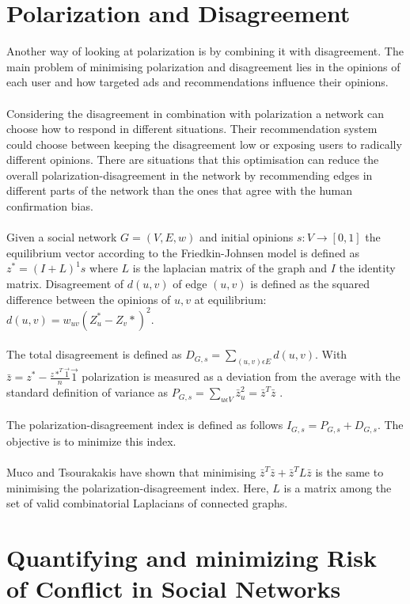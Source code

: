 \section{Polarization and Disagreement}
\label{sec:polarizationDisareement}

Another way of looking at polarization is by combining it with disagreement. The main problem of minimising polarization and disagreement lies in the opinions of each user and how targeted ads and recommendations influence their opinions. 
\\
\\
Considering the disagreement in combination with polarization a network can choose how to respond in different situations. Their recommendation system could choose between keeping the disagreement low or exposing users to radically different opinions. There are situations that this optimisation can reduce the overall polarization-disagreement in the network by recommending edges in different parts of the network than the ones that agree with the human confirmation bias. 
\\
\\
Given a social network $G = (V,E,w)$ and initial opinions $s: V \rightarrow [0,1]$ the equilibrium vector according to the Friedkin-Johnsen model is defined as $z^*=(I+L)^1s$ where $L$ is the laplacian matrix of the graph and $I$ the identity matrix. Disagreement of $d(u,v)$ of edge $(u,v)$ is defined as the squared difference between the opinions of $u,v$ at equilibrium: $d(u,v) = w_{uv}(Z_u^* - Z_v*)^2.$ 
\\
\\
The total disagreement is defined as $D_{G,s} = \sum_{(u,v) \epsilon E} d(u,v)$. With $\bar z = z^* - \frac{z*^T \overrightarrow 1}{n}\overrightarrow 1$ polarization is measured as a deviation from the average with the standard definition of variance as $P_{G,s} = \sum_{u\epsilon V} \bar z_u^2 = \bar z^T \bar z$ .
\\
\\
The polarization-disagreement index is defined as follows $I_{G,s} = P_{G,s} +D_{G,s}$. The objective is to minimize this index. 
\\
\\
Muco and Tsourakakis have shown that minimising $\bar z^T \bar z + \bar z^T L\bar z$ is the same to minimising the polarization-disagreement index. Here, $L$ is a matrix among the set of valid combinatorial Laplacians of connected graphs.\cite{musco}

\section{Quantifying and minimizing Risk of Conflict in Social Networks}
\label{sec:riskOfConflict}

